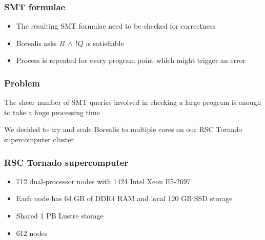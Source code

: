 \begin{frame}
	\frametitle{SMT formulae}
\begin{itemize}
	\item The resulting SMT formulae need to be checked for correctness
	\item Borealis asks $B \ \wedge \ !Q$ is satisfiable
	\item Process is repeated for every program point which might trigger an error
\end{itemize}
\end{frame}


\begin{frame}
\frametitle{Problem}
\begin{block}{}
	\centering
	The sheer number of SMT queries involved in checking a large program is enough to take a huge processing time
\end{block}


\begin{block}{}
	\centering
	We decided to try and scale Borealis to multiple cores on our RSC Tornado supercomputer cluster
\end{block}
\end{frame}


\begin{frame}
\frametitle{RSC Tornado supercomputer}
\begin{itemize}
\item 712 dual-processor nodes with 1424 Intel Xeon E5-2697
\item Each node has 64 GB of DDR4 RAM and local 120 GB SSD storage
\item Shared 1 PB Lustre storage
\item 612 nodes
\end{itemize}
\end{frame}
